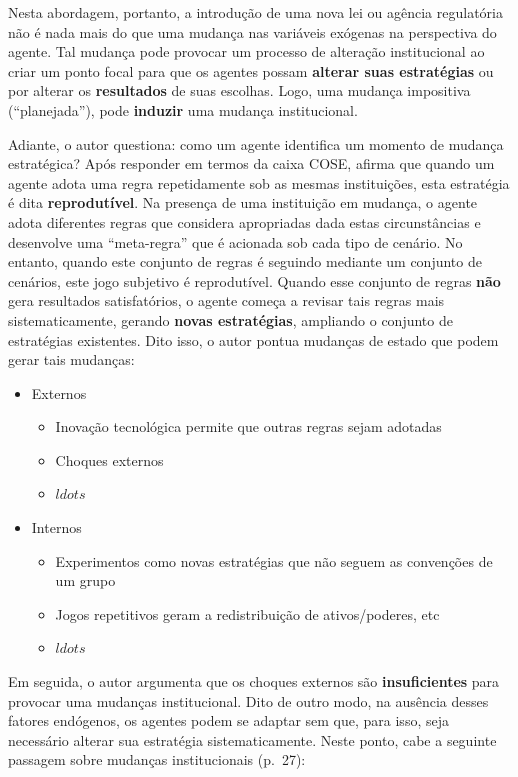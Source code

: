 \documentclass[9pt,twocolumn,twoside,lineno]{style}
\begin{document}
Nesta abordagem, portanto, a introdução de uma nova lei ou agência regulatória não é nada mais do que uma mudança nas variáveis exógenas na perspectiva do agente. Tal mudança pode provocar um processo de alteração institucional ao criar um ponto focal para que os agentes possam \textbf{alterar suas estratégias} ou por alterar os \textbf{resultados} de suas escolhas. Logo, uma mudança impositiva (``planejada''), pode \textbf{induzir} uma mudança institucional. 

Adiante, o autor questiona: como um agente identifica um momento de mudança estratégica? Após responder em termos da caixa COSE, afirma que quando um agente adota uma regra repetidamente sob as mesmas instituições, esta estratégia é dita \textbf{reprodutível}. Na presença de uma instituição em mudança, o agente adota diferentes regras que considera apropriadas dada estas circunstâncias e desenvolve uma ``meta-regra'' que é acionada sob cada tipo de cenário. No entanto, quando este conjunto de regras é seguindo mediante um conjunto de cenários, este jogo subjetivo é reprodutível. Quando esse conjunto de regras \textbf{não} gera resultados satisfatórios, o agente começa a revisar tais regras mais sistematicamente, gerando \textbf{novas estratégias}, ampliando o conjunto de estratégias existentes. Dito isso, o autor pontua mudanças de estado que podem gerar tais mudanças:

\begin{itemize}
	\item Externos
	\begin{itemize}
		\item Inovação tecnológica permite que outras regras sejam adotadas
		\item Choques externos
		\item $ldots$
	\end{itemize}
	\item Internos
	\begin{itemize}
		\item Experimentos como novas estratégias que não seguem as convenções de um grupo
		\item Jogos repetitivos geram a redistribuição de ativos/poderes, etc
		\item $ldots$
	\end{itemize}
\end{itemize}
Em seguida, o autor argumenta que os choques externos são \textbf{insuficientes} para provocar uma mudanças institucional. Dito de outro modo, na ausência desses fatores endógenos, os agentes podem se adaptar sem que, para isso, seja necessário alterar sua estratégia sistematicamente. Neste ponto, cabe a seguinte passagem sobre mudanças institucionais (p.~27):
\end{document}

